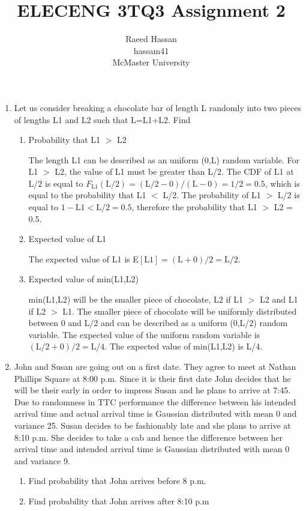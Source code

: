 \documentclass[12pt]{article}
\title{ELECENG 3TQ3 Assignment 2}
\author{Raeed Hassan \\ hassam41 \\ McMaster University}
\begin{document}
\maketitle
\pagebreak
\begin{enumerate}
    \item Let us consider breaking a chocolate bar of length L randomly into two pieces of lengths L1 and L2 such that L=L1+L2. Find
    \begin{enumerate}
        \item Probability that L1 $>$ L2

        The length L1 can be described as an uniform (0,L) random variable. For L1 $>$ L2, the value of L1 must be greater than L/2. The CDF of L1 at L/2 is equal to $F_{\text{L1}}(\text{L}/2)=(\text{L}/2-0)/(\text{L}-0)=1/2=0.5$, which is equal to the probability that L1 $<$ L/2. The probability of L1 $>$ L/2 is equal to $1 - \text{L1} < \text{L/2} = 0.5$, therefore the probability that L1 $>$ L2 = 0.5. 

        \item Expected value of L1
        
        The expected value of L1 is E$[\text{L1}] = (\text{L} + 0)/2 = \text{L}/2$.
 
        \item Expected value of min(L1,L2)

        min(L1,L2) will be the smaller piece of chocolate, L2 if L1 $>$ L2 and L1 if L2 $>$ L1. The smaller piece of chocolate will be uniformly distributed between 0 and L/2 and can be described as a uniform (0,L/2) random variable. The expected value of the uniform random variable is $(\text{L}/2 + 0) / 2 = \text{L}/4$. The expected value of min(L1,L2) is L/4.
    \end{enumerate}
    \item John and Susan are going out on a first date. They agree to meet at Nathan Phillips Square at 8:00 p.m. Since it is their first date John decides that he will be their early in order to impress Susan and he plans to arrive at 7:45. Due to randomness in TTC performance the difference between his intended arrival time and actual arrival time is Gaussian distributed with mean 0 and variance 25.  Susan decides to be fashionably late and she plans to arrive at 8:10 p.m. She decides to take a cab and hence the difference between her arrival time and intended arrival time is Gaussian distributed with mean 0 and variance 9.

    \begin{enumerate}
        \item Find probability that John arrives before 8 p.m.
        \item Find probability that John arrives after 8:10 p.m


\end{enumerate}
\end{enumerate}
\end{document}
